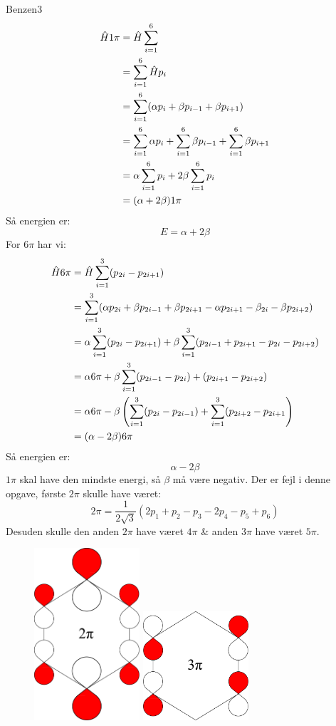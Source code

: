 \begin{opgave}{Benzen}{3}
\begin{align*}
\hat H 1\pi &= \hat H \sum_{i=1}^6\\
&= \sum_{i=1}^6 \hat Hp_i\\
&= \sum_{i=1}^6 (\alpha p_i+\beta p_{i-1}+\beta p_{i+1})\\
&= \sum_{i=1}^6 \alpha p_i+\sum_{i=1}^6\beta p_{i-1}+\sum_{i=1}^6\beta p_{i+1}\\
&= \alpha \sum_{i=1}^6 p_i+2\beta \sum_{i=1}^6 p_i\\
&= (\alpha +2\beta)1\pi
\end{align*}
Så energien er:
$$
E=\alpha + 2\beta
$$
For $6\pi$ har vi:
\begin{align*}
\hat H 6\pi &= \hat H \sum_{i=1}^3 (p_{2i}-p_{2i+1})\\
&=\sum_{i=1}^3 (\alpha p_{2i}+\beta p_{2i-1}+\beta p_{2i+1}-\alpha p_{2i+1}-\beta_{2i}-\beta p_{2i+2})\\
&= \alpha \sum_{i=1}^3 (p_{2i}-p_{2i+1})+\beta\sum_{i=1}^3(p_{2i-1}+p_{2i+1}-p_{2i}-p_{2i+2})\\
&=\alpha 6\pi+\beta\sum_{i=1}^3(p_{2i-1}-p_{2i})+(p_{2i+1}-p_{2i+2})\\
&=\alpha6\pi-\beta\left(\sum_{i=1}^3(p_{2i}-p_{2i-1})+\sum_{i=1}^3(p_{2i+2}-p_{2i+1}\right)\\
&= (\alpha-2\beta)6\pi
\end{align*}
Så energien er:
$$
\alpha-2\beta
$$
\opg $1\pi$ skal have den mindste energi, så $\beta$ må være negativ.
\opg
Der er fejl i denne opgave, første $2\pi$ skulle have været:
$$
2\pi = \frac{1}{2\sqrt{3}}\left(2p_1+p_2-p_3-2p_4-p_5+p_6\right)
$$
Desuden skulle den anden  $2\pi$ have været $4\pi$ \& anden $3\pi$ have været $5\pi$.
\begin{figure}[h]
\center
\includegraphics[width = 0.35\textwidth]{Atom-ogMolekylefysik/billeder/benzen2.pdf}
\includegraphics[width = 0.35\textwidth]{Atom-ogMolekylefysik/billeder/benzen3.pdf}

\end{figure}
\end{opgave}
